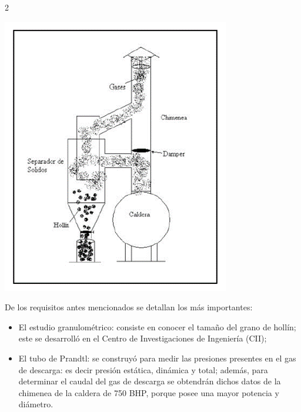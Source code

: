 \documentclass[12pt,spanish,Letterpaper,openany]{book}
\begin{document}
\begin {multicols}{2}
\begin {flushleft}
\begin{minipage}[c]{\columnwidth}
\includegraphics[width=1\linewidth]{images/image04_wvaliente}

\end{minipage}

\end {flushleft}

De los requisitos antes mencionados se detallan los más importantes:

\begin{itemize}
\item
  El estudio granulométrico: consiste en conocer el tamaño del grano de hollín; este se desarrolló en el Centro de Investigaciones de Ingeniería (CII);
\item
  El tubo de Prandtl: se construyó para medir las presiones presentes en el gas de descarga: es decir presión estática, dinámica y total; además, para determinar el caudal del gas de descarga se obtendrán dichos datos de la chimenea de la caldera de 750 BHP, porque posee una mayor potencia y diámetro.
\end{itemize}


\end{multicols}
\end{document}
